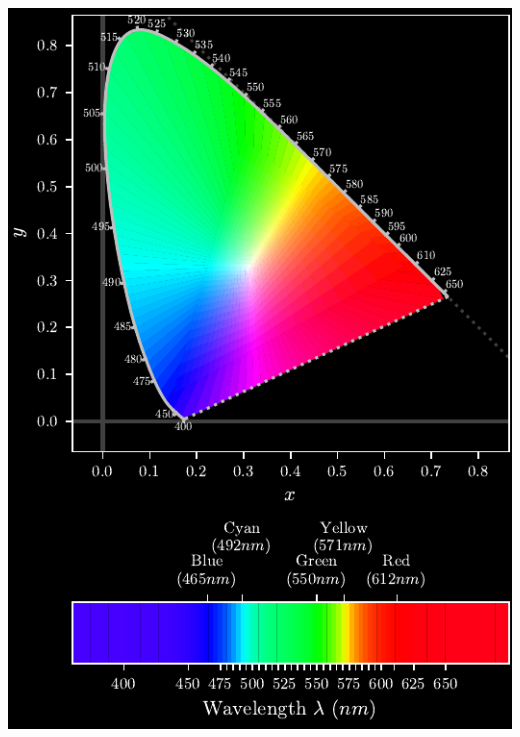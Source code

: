\documentclass{article}
\newenvironment{halffigure}
    {\par\medskip\noindent\minipage{\linewidth}}
    {\endminipage\par\medskip}
\newif\ifinvert
\begin{document}
\begin{multicols}{2}
\begin{halffigure} %
    \ifinvert
        \includegraphics{../images/figure_18_visible_spectrum_locus_inverted.pdf}
    \else

\end{halffigure}
\end{multicols}
\end{document}
